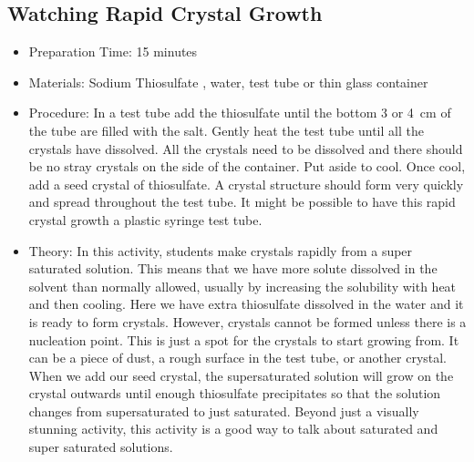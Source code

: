 \subsection{Watching Rapid Crystal Growth}
\begin{itemize}
\item{Preparation Time: 15 minutes}
\item{Materials: Sodium Thiosulfate , water, test tube or thin glass container}
\item{Procedure: In a test tube add the thiosulfate until the bottom 3 or 4~cm of the tube are filled with the salt. Gently heat the test tube until all the crystals have dissolved. All the crystals need to be dissolved and there should be no stray crystals on the side of the container. Put aside to cool. Once cool, add a seed crystal of thiosulfate. A crystal structure should form very quickly and spread throughout the test tube. It might be possible to have this rapid crystal growth a plastic syringe test tube.}
\item{Theory: In this activity, students make crystals rapidly from a super saturated solution. This means that we have more solute dissolved in the solvent than normally allowed, usually by increasing the solubility with heat and then cooling. Here we have extra thiosulfate dissolved in the water and it is ready to form crystals. However, crystals cannot be formed unless there is a nucleation point. This is just a spot for the crystals to start growing from. It can be a piece of dust, a rough surface in the test tube, or another crystal. When we add our seed crystal, the supersaturated solution will grow on the crystal outwards until enough thiosulfate precipitates so that the solution changes from supersaturated to just saturated. Beyond just a visually stunning activity, this activity is a good way to talk about saturated and super saturated solutions.}
\end{itemize}

